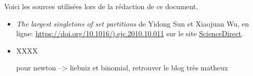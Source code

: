 Voici les sources utilisées lors de la rédaction de ce document.
%
\begin{itemize}
	\item \emph{\og The largest singletons of set partitions \fg}
de Yidong Sun et Xiaojuan Wu, en ligne:
	\url{https://doi.org/10.1016/j.ejc.2010.10.011}
	sur le site \href{https://www.sciencedirect.com/}{ScienceDirect}.

	\item XXXX
	
	pour newton --> liebniz et binomial, retrouver le blog très matheux

\end{itemize}